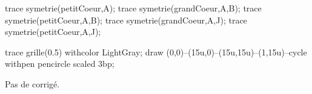 \begin{enigme}[Pavage]
\begin{changemargin}{-10mm}{-10mm}
\begin{minipage}{4.5cm}
\begin{Geometrie}[CoinHD={(5u,5u)}]
                trace symetrie(petitCoeur,A);
                trace symetrie(grandCoeur,A,B);
                trace symetrie(petitCoeur,A,B);
                trace symetrie(grandCoeur,A,J);
                trace symetrie(petitCoeur,A,J);
            \end{Geometrie}
         \end{minipage}
         \begin{center}
            \begin{Geometrie}[CoinHD={(15u,15u)}]
                trace grille(0.5) withcolor LightGray;
                draw (0,0)--(15u,0)--(15u,15u)--(1,15u)--cycle withpen pencircle scaled 3bp;
            \end{Geometrie}
         \end{center}
    \end{changemargin}
\end{enigme}

\begin{corrige}
    Pas de corrigé.
\end{corrige}
 